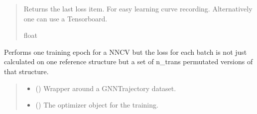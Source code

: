 \documentclass[a4paper,10pt,english]{report}
\begin{document}
\begin{fulllineitems}
\begin{quote}
\begin{description}
\begin{itemize}
\end{itemize}

\sphinxAtStartPar
Returns the last loss item. For easy learning curve recording. Alternatively one can use a Tensorboard.

\sphinxAtStartPar
float

\end{description}\end{quote}

\end{fulllineitems}


\begin{fulllineitems}
\label{\detokenize{NNucleate:NNucleate.training.train_perm}}
\pysigstartsignatures
{}
\pysigstopsignatures
\sphinxAtStartPar
Performs one training epoch for a NNCV but the loss for each batch is not just calculated on one reference structure but a set of n\_trans permutated versions of that structure.
\begin{quote}\begin{description}
\begin{itemize}
\item {} 
\sphinxAtStartPar
{} () \textendash{} Wrapper around a GNNTrajectory dataset.

\item {} 
\sphinxAtStartPar
{} () \textendash{} The optimizer object for the training.


\end{itemize}
\end{description}
\end{quote}
\end{fulllineitems}
\end{document}
